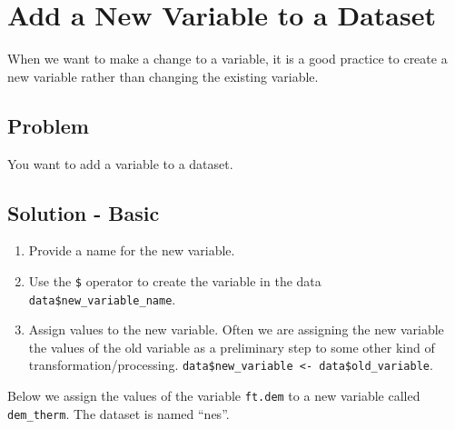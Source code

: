 \documentclass[
]{book}
\newenvironment{Shaded}{\begin{snugshade}}{\end{snugshade}}
\newcommand{\CommentTok}[1]{\textcolor[rgb]{0.56,0.35,0.01}{\textit{#1}}}
\newcommand{\NormalTok}[1]{#1}
\newcommand{\OtherTok}[1]{\textcolor[rgb]{0.56,0.35,0.01}{#1}}
\newcommand{\SpecialCharTok}[1]{\textcolor[rgb]{0.81,0.36,0.00}{\textbf{#1}}}
\providecommand{\tightlist}{%
  \setlength{\itemsep}{0pt}\setlength{\parskip}{0pt}}
\begin{document}
\hypertarget{add-variable}{%
\section{Add a New Variable to a Dataset}\label{add-variable}}

When we want to make a change to a variable, it is a good practice to create a new variable rather than changing the existing variable.

\hypertarget{problem-15}{%
\subsection{Problem}\label{problem-15}}

You want to add a variable to a dataset.

\hypertarget{solution---basic}{%
\subsection{Solution - Basic}\label{solution---basic}}

\begin{enumerate}
\def\labelenumi{\arabic{enumi}.}
\tightlist
\item
  Provide a name for the new variable.
\item
  Use the \texttt{\$} operator to create the variable in the data \texttt{data\$new\_variable\_name}.
\item
  Assign values to the new variable. Often we are assigning the new variable the values of the old variable as a preliminary step to some other kind of transformation/processing. \texttt{data\$new\_variable\ \textless{}-\ data\$old\_variable}.
\end{enumerate}

\begin{Shaded}
\end{Shaded}

Below we assign the values of the variable \texttt{ft.dem} to a new variable called \texttt{dem\_therm}. The dataset is named ``nes''.

\begin{Shaded}
\end{Shaded}
\end{document}
